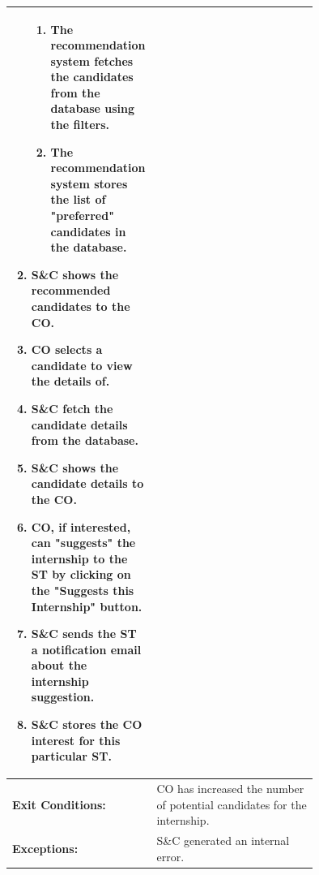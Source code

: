 \begin{center}
\begin{longtable}{|l|p{0.75\linewidth}|}
\begin{enumerate}
\begin{enumerate}
                      \item The recommendation system fetches the candidates from the database using the filters.
                      \item The recommendation system stores the list of "preferred" candidates in the database.
                  \end{enumerate}
                                         \item S\&C shows the recommended candidates to the CO.
                                         \item CO selects a candidate to view the details of.
                                         \item S\&C fetch the candidate details from the database.
                                         \item S\&C shows the candidate details to the CO.
                                         \item CO, if interested, can "suggests" the internship to the ST by clicking on the "Suggests this Internship" button.
                                         \item S\&C sends the ST a notification email about the internship suggestion.
                                         \item S\&C stores the CO interest for this particular ST.
                                     \end{enumerate} \\
        \hline
        \textbf{Exit Conditions:}  & CO has increased the number of potential candidates for the internship.                                               \\
        \hline
        \textbf{Exceptions:}       & S\&C generated an internal error.                                                                                     \\
        \hline
    \end{longtable}
\end{center}

